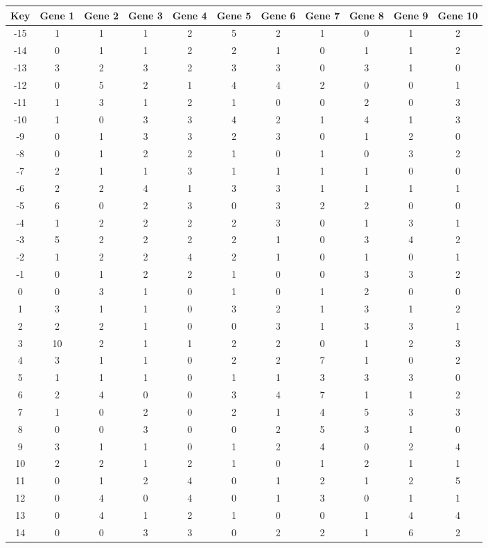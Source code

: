 \begin{tabular}{|c|c|c|c|c|c|c|c|c|c|c|}
\hline
Key & Gene 1 & Gene 2 & Gene 3 & Gene 4 & Gene 5 & Gene 6 & Gene 7 & Gene 8 & Gene 9 & Gene 10 \\
\hline
-15 & 1 & 1 & 1 & 2 & 5 & 2 & 1 & 0 & 1 & 2 \\
-14 & 0 & 1 & 1 & 2 & 2 & 1 & 0 & 1 & 1 & 2 \\
-13 & 3 & 2 & 3 & 2 & 3 & 3 & 0 & 3 & 1 & 0 \\
-12 & 0 & 5 & 2 & 1 & 4 & 4 & 2 & 0 & 0 & 1 \\
-11 & 1 & 3 & 1 & 2 & 1 & 0 & 0 & 2 & 0 & 3 \\
-10 & 1 & 0 & 3 & 3 & 4 & 2 & 1 & 4 & 1 & 3 \\
-9 & 0 & 1 & 3 & 3 & 2 & 3 & 0 & 1 & 2 & 0 \\
-8 & 0 & 1 & 2 & 2 & 1 & 0 & 1 & 0 & 3 & 2 \\
-7 & 2 & 1 & 1 & 3 & 1 & 1 & 1 & 1 & 0 & 0 \\
-6 & 2 & 2 & 4 & 1 & 3 & 3 & 1 & 1 & 1 & 1 \\
-5 & 6 & 0 & 2 & 3 & 0 & 3 & 2 & 2 & 0 & 0 \\
-4 & 1 & 2 & 2 & 2 & 2 & 3 & 0 & 1 & 3 & 1 \\
-3 & 5 & 2 & 2 & 2 & 2 & 1 & 0 & 3 & 4 & 2 \\
-2 & 1 & 2 & 2 & 4 & 2 & 1 & 0 & 1 & 0 & 1 \\
-1 & 0 & 1 & 2 & 2 & 1 & 0 & 0 & 3 & 3 & 2 \\
0 & 0 & 3 & 1 & 0 & 1 & 0 & 1 & 2 & 0 & 0 \\
1 & 3 & 1 & 1 & 0 & 3 & 2 & 1 & 3 & 1 & 2 \\
2 & 2 & 2 & 1 & 0 & 0 & 3 & 1 & 3 & 3 & 1 \\
3 & 10 & 2 & 1 & 1 & 2 & 2 & 0 & 1 & 2 & 3 \\
4 & 3 & 1 & 1 & 0 & 2 & 2 & 7 & 1 & 0 & 2 \\
5 & 1 & 1 & 1 & 0 & 1 & 1 & 3 & 3 & 3 & 0 \\
6 & 2 & 4 & 0 & 0 & 3 & 4 & 7 & 1 & 1 & 2 \\
7 & 1 & 0 & 2 & 0 & 2 & 1 & 4 & 5 & 3 & 3 \\
8 & 0 & 0 & 3 & 0 & 0 & 2 & 5 & 3 & 1 & 0 \\
9 & 3 & 1 & 1 & 0 & 1 & 2 & 4 & 0 & 2 & 4 \\
10 & 2 & 2 & 1 & 2 & 1 & 0 & 1 & 2 & 1 & 1 \\
11 & 0 & 1 & 2 & 4 & 0 & 1 & 2 & 1 & 2 & 5 \\
12 & 0 & 4 & 0 & 4 & 0 & 1 & 3 & 0 & 1 & 1 \\
13 & 0 & 4 & 1 & 2 & 1 & 0 & 0 & 1 & 4 & 4 \\
14 & 0 & 0 & 3 & 3 & 0 & 2 & 2 & 1 & 6 & 2 \\
\hline
\end{tabular}